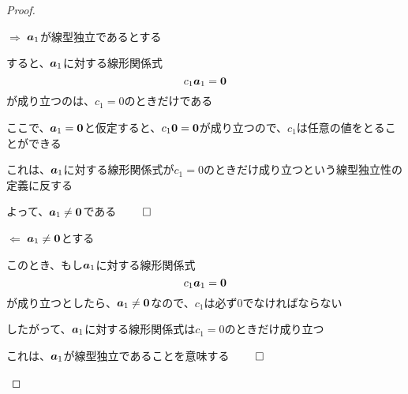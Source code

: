 \documentclass[../../../topic_linear-algebra]{subfiles}
\begin{document}
\begin{proof}
  \begin{subpattern}{$\Longrightarrow$}
    $\vb*{a}_1$が線型独立であるとする

    すると、$\vb*{a}_1$に対する線形関係式
    \begin{equation*}
      c_1 \vb*{a}_1 = \vb*{0}
    \end{equation*}
    が成り立つのは、$c_1 = 0$のときだけである

    \br

    ここで、$\vb*{a}_1 = \vb*{0}$と仮定すると、$c_1 \vb*{0} = \vb*{0}$が成り立つので、$c_1$は任意の値をとることができる

    これは、$\vb*{a}_1$に対する線形関係式が$c_1 =0$のときだけ成り立つという線型独立性の定義に反する

    よって、$\vb*{a}_1 \neq \vb*{0}$である $\qed$
  \end{subpattern}

  \begin{subpattern}{$\Longleftarrow$}
    $\vb*{a}_1 \neq \vb*{0}$とする

    このとき、もし$\vb*{a}_1$に対する線形関係式
    \begin{equation*}
      c_1 \vb*{a}_1 = \vb*{0}
    \end{equation*}
    が成り立つとしたら、$\vb*{a}_1 \neq \vb*{0}$なので、$c_1$は必ず0でなければならない

    したがって、$\vb*{a}_1$に対する線形関係式は$c_1 = 0$のときだけ成り立つ

    これは、$\vb*{a}_1$が線型独立であることを意味する $\qed$
  \end{subpattern}
\end{proof}
\end{document}
